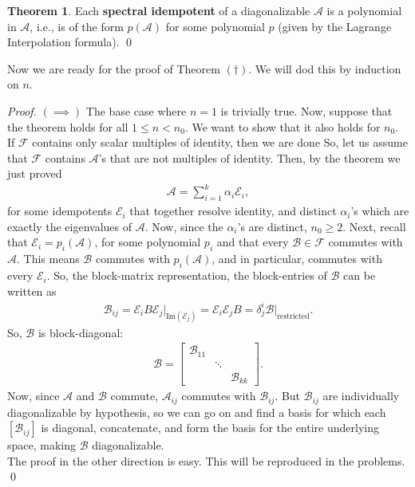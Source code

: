 \documentclass{book}
\theoremstyle{definition}
\newtheorem{thm}{Theorem}[section]
\newcommand{\F}{\mathcal{F}}
\newcommand{\A}{\mathcal{A}}
\newcommand{\B}{\mathcal{B}}
\newcommand{\E}{\mathcal{E}}
\newcommand{\ima}{\text{Im}}
\begin{document}
\begin{thm}
	Each \textbf{spectral idempotent} of a diagonalizable $\A$ is a polynomial in $\A$, i.e., is of the form $p(\A)$ for some polynomial $p$ (given by the Lagrange Interpolation formula). \qed
\end{thm}

Now we are ready for the proof of Theorem $(\dagger)$. We will dod this by induction on $n$. 
\begin{proof}
	$(\implies)$ The base case where $n=1$ is trivially true. Now, suppose that the theorem holds for all $1\leq n < n_0$. We want to show that it also holds for $n_0$. If $\F$ contains only scalar multiples of identity, then we are done So, let us assume that $\F$ contains $\A$'s that are not multiples of identity. Then, by the theorem we just proved
	\begin{align*}
	\A = \sum^k_{i=1}\alpha_i\E_i,
	\end{align*}
	for some idempotents $\E_i$ that together resolve identity, and distinct $\alpha_i$'s which are exactly the eigenvalues of $\A$. Now, since the $\alpha_i$'s are distinct, $n_0 \geq 2$. Next, recall that $\E_i = p_i(\A)$, for some polynomial $p_i$ and that every $\B \in \F$ commutes with $\A$. This means $\B$ commutes with $p_i(\A)$, and in particular, commutes with every $\E_i$. So, the block-matrix representation, the block-entries of $\B$ can be written as
	\begin{align*}
	\B_{ij} = \E_i B \E_j\bigg\vert_{\ima(\E_j)} = \E_i \E_j B = \delta^i_j\B\bigg\vert_{\text{restricted}}.
	\end{align*}
	So, $\B$ is block-diagonal:
	\begin{align*}
	\B = \begin{bmatrix}
	\B_{11} & & \\
	& \ddots &\\
	& & \B_{kk} 
	\end{bmatrix}.
	\end{align*}
	Now, since $\A$ and $\B$ commute, $\A_{ij}$ commutes with $\B_{ij}$. But $\B_{ij}$ are individually diagonalizable by hypothesis, so we can go on and find a basis for which each $[\B_{ij}]$ is diagonal, concatenate, and form the basis for the entire underlying space, making $\B$ diagonalizable. \\
	
	The proof in the other direction is easy. This will be reproduced in the problems. \qed
\end{proof}
\end{document}
